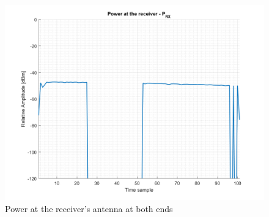 \begin{figure}[H]
	\centering
	\includegraphics[scale=0.75]{figures/s4_power.png}
	\caption{Power at the receiver's antenna at both ends}
	\label{fig:s4_power}
\end{figure}